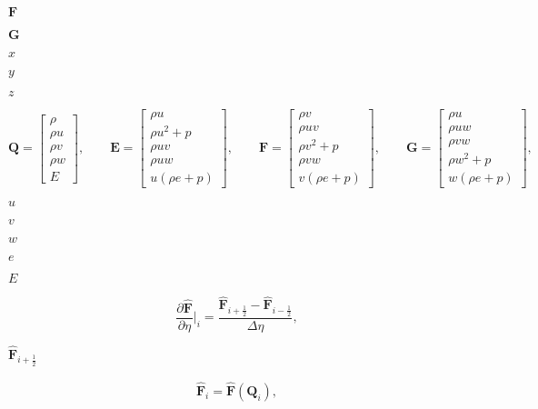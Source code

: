 \documentclass{article}
\begin{document}
$\mathbf{F}$
\pagebreak

$\mathbf{G}$
\pagebreak

$x$
\pagebreak

$y$
\pagebreak

$z$
\pagebreak

\[ \begin{equation*} \mathbf{Q}= \begin{bmatrix} \rho \\ \rho u \\ \rho v \\ \rho w \\ E \end{bmatrix}, \qquad \mathbf{E}= \begin{bmatrix} \rho u \\ \rho u^2+p \\ \rho uv \\ \rho uw \\ u(\rho e+p) \end{bmatrix}, \qquad \mathbf{F}= \begin{bmatrix} \rho v \\ \rho uv \\ \rho v^2+p \\ \rho vw \\ v(\rho e+p) \end{bmatrix}, \qquad \mathbf{G}= \begin{bmatrix} \rho u \\ \rho uw \\ \rho vw \\ \rho w^2+p \\ w(\rho e+p) \end{bmatrix}, \end{equation*} \]
\pagebreak

$u$
\pagebreak

$v$
\pagebreak

$w$
\pagebreak

$e$
\pagebreak

$E$
\pagebreak

\[ \begin{equation*} \frac{\partial \hat{\mathbf{F}}}{\partial \eta}\bigg\rvert_{i}=\frac{ \hat{\mathbf{F}}_{i+\frac{1}{2}}-\hat{\mathbf{F}}_{i-\frac{1}{2}}}{\Delta \eta}, \end{equation*} \]
\pagebreak

$\hat{\mathbf{F}}_{i+\frac{1}{2}}$
\pagebreak

\[ \begin{align*} \hat{\mathbf{F}}_{i} = \hat{\mathbf{F}}(\mathbf{Q}_{i}), \end{align*} \]
\pagebreak
\end{document}
